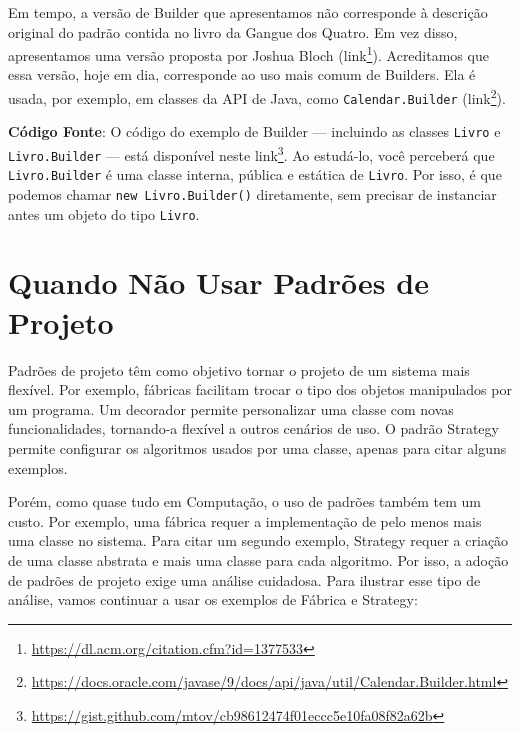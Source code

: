 \documentclass[
  11pt,
  twoside]{book}
\newcommand{\passthrough}[1]{#1}
\DeclareRobustCommand{\href}[2]{#2\footnote{\url{#1}}}
\begin{document}
Em tempo, a versão de Builder que apresentamos não corresponde à
descrição original do padrão contida no livro da Gangue dos Quatro. Em
vez disso, apresentamos uma versão proposta por Joshua Bloch
(\href{https://dl.acm.org/citation.cfm?id=1377533}{link}). Acreditamos
que essa versão, hoje em dia, corresponde ao uso mais comum de Builders.
Ela é usada, por exemplo, em classes da API de Java, como
\passthrough{\lstinline!Calendar.Builder!}
(\href{https://docs.oracle.com/javase/9/docs/api/java/util/Calendar.Builder.html}{link}).

\textbf{Código Fonte}: O código do exemplo de Builder --- incluindo as
classes \passthrough{\lstinline!Livro!} e
\passthrough{\lstinline!Livro.Builder!} --- está disponível neste
\href{https://gist.github.com/mtov/cb98612474f01eccc5e10fa08f82a62b}{link}.
Ao estudá-lo, você perceberá que \passthrough{\lstinline!Livro.Builder!}
é uma classe interna, pública e estática de
\passthrough{\lstinline!Livro!}. Por isso, é que podemos chamar
\passthrough{\lstinline!new Livro.Builder()!} diretamente, sem precisar
de instanciar antes um objeto do tipo \passthrough{\lstinline!Livro!}.

\hypertarget{quando-nuxe3o-usar-padruxf5es-de-projeto}{%
\section{Quando Não Usar Padrões de
Projeto}\label{quando-nuxe3o-usar-padruxf5es-de-projeto}}

Padrões de projeto têm como objetivo tornar o projeto de um sistema mais
flexível. Por exemplo, fábricas facilitam trocar o tipo dos objetos
manipulados por um programa. Um decorador permite personalizar uma
classe com novas funcionalidades, tornando-a flexível a outros cenários
de uso. O padrão Strategy permite configurar os algoritmos usados por
uma classe, apenas para citar alguns exemplos.

Porém, como quase tudo em Computação, o uso de padrões também tem um
custo. Por exemplo, uma fábrica requer a implementação de pelo menos
mais uma classe no sistema. Para citar um segundo exemplo, Strategy
requer a criação de uma classe abstrata e mais uma classe para cada
algoritmo. Por isso, a adoção de padrões de projeto exige uma análise
cuidadosa. Para ilustrar esse tipo de análise, vamos continuar a usar os
exemplos de Fábrica e Strategy:
\end{document}

